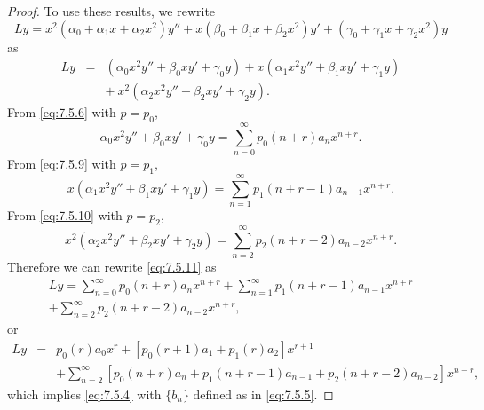 \documentclass{ximera}
\begin{document}
\begin{proof}
To use these results, we rewrite
$$
Ly=
x^2(\alpha_0+\alpha_1x+\alpha_2x^2)y''+x(\beta_0+\beta_1x+\beta_2x^2)y'
+(\gamma_0+\gamma_1x+\gamma_2x^2)y
$$
 as
\begin{equation} \label{eq:7.5.11}
\begin{array}{ccl}
Ly&=&\left(\alpha_0x^2y''+\beta_0xy'
+\gamma_0y\right) +
x\left(\alpha_1x^2y''+\beta_1xy'+\gamma_1y\right)
\\&&+\
x^2\left(\alpha_2x^2y''+\beta_2xy'+\gamma_2y\right).
\end{array}
\end{equation}
From \eqref{eq:7.5.6} with $p=p_0$,
$$
\alpha_0x^2y''+\beta_0xy'+\gamma_0y=\sum_{n=0}^\infty
p_0(n+r)a_nx^{n+r}.
$$
From \eqref{eq:7.5.9} with $p=p_1$,
$$
x\left(\alpha_1x^2y''+\beta_1xy'+\gamma_1y\right)=\sum_{n=1}^\infty
p_1(n+r-1)a_{n-1}x^{n+r}.
$$
From \eqref{eq:7.5.10} with $p=p_2$,
$$
x^2\left(\alpha_2x^2y''+\beta_2xy'+\gamma_2y\right)=\sum_{n=2}^\infty
p_2(n+r-2)a_{n-2}x^{n+r}.
$$
Therefore we can rewrite \eqref{eq:7.5.11} as
\begin{eqnarray*}
Ly=\sum_{n=0}^\infty p_0(n+r)a_nx^{n+r}+
\sum_{n=1}^\infty p_1(n+r-1)a_{n-1}x^{n+r}\\+
\sum_{n=2}^\infty p_2(n+r-2)a_{n-2}x^{n+r},
\end{eqnarray*}
or
\begin{eqnarray*}
Ly&=& p_0(r)a_0x^r+\left[p_0(r+1)a_1+p_1(r)a_2\right]x^{r+1}\\
&& +\sum_{n=2}^\infty\left[p_0(n+r)a_n+p_1(n+r-1)a_{n-1}
+p_2(n+r-2)a_{n-2}\right]x^{n+r},
\end{eqnarray*}
which implies \eqref{eq:7.5.4} with $\{b_n\}$ defined as in
\eqref{eq:7.5.5}.
\end{proof}
\end{document}
